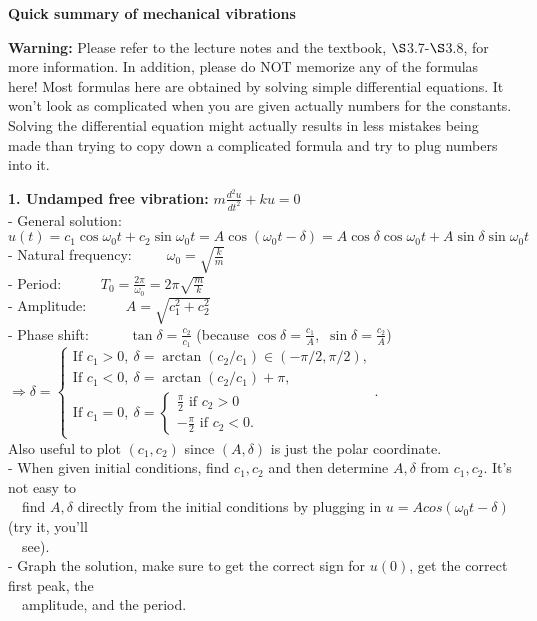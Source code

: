 \documentclass[11pt]{article}
\numberwithin{equation}{section}
\begin{document}
\begin{center}
\textbf{Quick summary of mechanical vibrations}
\end{center}

\noindent \textbf{Warning: }   Please refer to the lecture notes and the textbook, $\S$3.7-$\S$3.8, for more information.  In addition, please do NOT memorize any of the formulas here!  Most formulas here are obtained by solving simple differential equations.  It won't look as complicated when you are given actually numbers for the constants.   Solving the differential equation might actually results in less mistakes being made than trying to copy down a complicated formula and try to plug numbers into it.  


\noindent \textbf{1. Undamped free vibration: }  $m\frac{d^2u}{dt^2}+ku=0$\\
\indent - General solution:
\[u(t)=c_1\cos \omega_0 t+c_2\sin\omega_0 t=A\cos (\omega_0 t-\delta)= A\cos\delta\cos \omega_0 t+A\sin\delta \sin \omega_0 t \]
\indent - Natural frequency:\ \ \ \ \   $\omega_0=\sqrt {\frac{k}{m}}$\\
\indent - Period: \ \ \ \ \  $T_0=\frac{2\pi}{\omega_0}= 2\pi\sqrt{\frac{m}{k}}$\\
\indent - Amplitude: \ \ \  \ \ $A=\sqrt {c_1^2+c_2^2}$\\
\indent - Phase shift:  \ \ \ \ \  $\tan\delta =\frac{c_2}{c_1}$ (because $\cos \delta = \frac{c_1}{A}$,\  $\sin \delta = \frac{c_2}{A}$)  \\
\indent \hspace{1.2in} 
$\Rightarrow \delta=
\begin{cases}
\text{If }c_1>0, \ \delta = \arctan(c_2/c_1)\in (-\pi/2,\pi/2), \\
\text{If } c_1<0, \ \delta= \arctan(c_2/c_1)+\pi, \\
\text{If } c_1=0, \ \delta= \begin{cases} \frac{\pi}{2} \text{ if } c_2>0 \\
-\frac{\pi}{2} \text{ if } c_2 <0.
\end{cases}

\end{cases}$.\\
\indent \hspace{1.2in} 
Also useful to plot $(c_1,  c_2)$ since $(A, \delta)$ is just the polar coordinate.\\
\indent - When given initial conditions, find $c_1, c_2$ and then determine $A, \delta$ from $c_1, c_2$.  It's not easy to\\
\indent \ \  find $A, \delta$ directly from the initial conditions by plugging in $u=Acos(\omega_0t -\delta)$ (try it, you'll \\
\indent \ \ see).  \\
\indent - Graph the solution, make sure to get the correct sign for $u(0)$, get the correct first peak, the \\
\indent \ \ amplitude, and the period.\\
\end{document}
